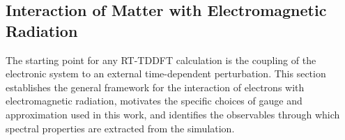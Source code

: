 
\providecommand{\Avec}{\mathbf{A}}
\providecommand{\Evec}{\mathbf{E}}
\providecommand{\Bvec}{\mathbf{B}}
\providecommand{\phat}{\hat{\mathbf{p}}}
\providecommand{\VKS}{V_{\text{eff}}}
\providecommand{\iunit}{\imath}
\providecommand{\myblue}[1]{\textcolor{blue}{#1}}


\subsection{Interaction of Matter with Electromagnetic Radiation}
\label{sec:em-interaction}

The starting point for any RT-TDDFT calculation is the coupling of
the electronic system to an external time-dependent perturbation.
This section establishes the general framework for the interaction
of electrons with electromagnetic radiation, motivates the specific
choices of gauge and approximation used in this work, and identifies
the observables through which spectral properties are extracted from
the simulation.


